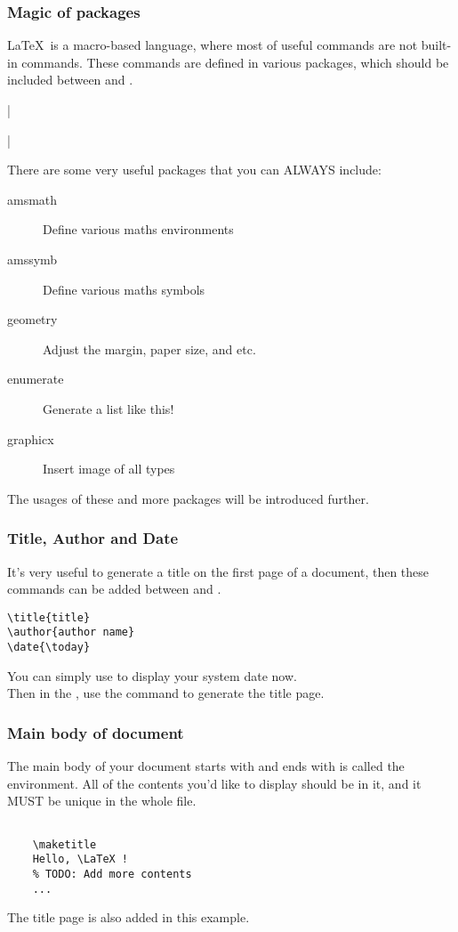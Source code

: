 \begin{frame}[fragile,label=package]
	\frametitle{Magic of packages}
	\LaTeX\ is a macro-based language, where most of useful commands are not built-in commands. These commands are defined in various packages, which should be included between \LC{\documentclass} and \LC{}.
	\begin{command}
		|\usepackage[options]{name}|
	\end{command}
	There are some very useful packages that you can \alert{ALWAYS} include:
	\begin{description}
		\item[amsmath] Define various maths environments
		\item[amssymb] Define various maths symbols
		\item[geometry] Adjust the margin, paper size, and etc.
		\item[enumerate] Generate a list like this!
		\item[graphicx] Insert image of all types
	\end{description}
	The usages of these and more packages will be introduced further.
\end{frame}

\begin{frame}[fragile]
	\frametitle{Title, Author and Date}
	It's very useful to generate a title on the first page of a document, then these commands can be added between \LC{\documentclass} and \LC{}.
	\begin{example}
		\begin{verbatim}
\title{title}
\author{author name}
\date{\today}
		\end{verbatim}
	\end{example}
	You can simply use \LC{\date{\today}} to display your system date now.\\[0.5em]
	Then in the , use the command \LC{\maketitle} to generate the title page.
\end{frame}

\begin{frame}[fragile]
	\frametitle{Main body of document}
	The main body of your document starts with \LC{} and ends with \LC{} is called the  environment. All of the contents you'd like to display should be in it, and it \alert{MUST} be \alert{unique} in the whole file.
	\begin{example}
		\begin{verbatim}

    \maketitle
    Hello, \LaTeX !
    % TODO: Add more contents
    ...

		\end{verbatim}
	\end{example}
	The title page is also added in this example.
\end{frame}

